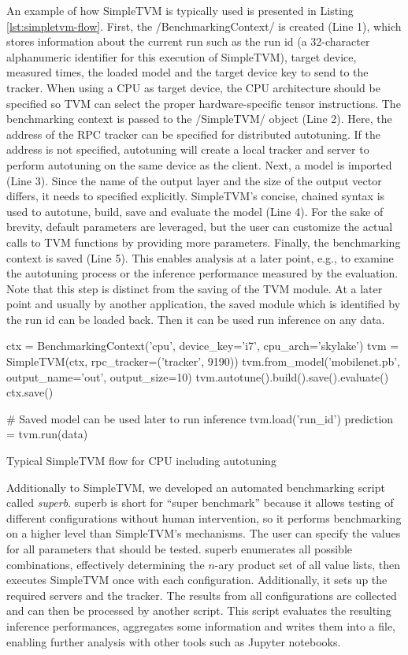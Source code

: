 An example of how SimpleTVM is typically used is presented in Listing \ref{lst:simpletvm-flow}. First, the \pythoninline/BenchmarkingContext/ is created (Line 1), which stores information about the current run such as the run id (a 32-character alphanumeric identifier for this execution of SimpleTVM), target device, measured times, the loaded model and the target device key to send to the tracker. When using a CPU as target device, the CPU architecture should be specified so TVM can select the proper hardware-specific tensor instructions. The benchmarking context is passed to the \pythoninline/SimpleTVM/ object (Line 2). Here, the address of the RPC tracker can be specified for distributed autotuning. If the address is not specified, autotuning will create a local tracker and server to perform autotuning on the same device as the client. Next, a model is imported (Line 3). Since the name of the output layer and the size of the output vector differs, it needs to specified explicitly. SimpleTVM's concise, chained syntax is used to autotune, build, save and evaluate the model (Line 4). For the sake of brevity, default parameters are leveraged, but the user can customize the actual calls to TVM functions by providing more parameters. Finally, the benchmarking context is saved (Line 5). This enables analysis at a later point, e.g., to examine the autotuning process or the inference performance measured by the evaluation. Note that this step is distinct from the saving of the TVM module. At a later point and usually by another application, the saved module which is identified by the run id can be loaded back. Then it can be used run inference on any data.

\begin{listing}
\begin{pythoncode}
ctx = BenchmarkingContext('cpu', device_key='i7', cpu_arch='skylake')
tvm = SimpleTVM(ctx, rpc_tracker=('tracker', 9190))
tvm.from_model('mobilenet.pb', output_name='out', output_size=10)
tvm.autotune().build().save().evaluate()
ctx.save()

# Saved model can be used later to run inference
tvm.load('run_id')
prediction = tvm.run(data)
\end{pythoncode}
\unskip
\caption{Typical SimpleTVM flow for CPU including autotuning}
\label{lst:simpletvm-flow}
\end{listing}

Additionally to SimpleTVM, we developed an automated benchmarking script called \textit{superb}. superb is short for \enquote{super benchmark} because it allows testing of different configurations without human intervention, so it performs benchmarking on a higher level than SimpleTVM's mechanisms. The user can specify the values for all parameters that should be tested. superb enumerates all possible combinations, effectively determining the $n$-ary product set of all value lists, then executes SimpleTVM once with each configuration. Additionally, it sets up the required servers and the tracker. The results from all configurations are collected and can then be processed by another script. This script evaluates the resulting inference performances, aggregates some information and writes them into a file, enabling further analysis with other tools such as Jupyter notebooks.

